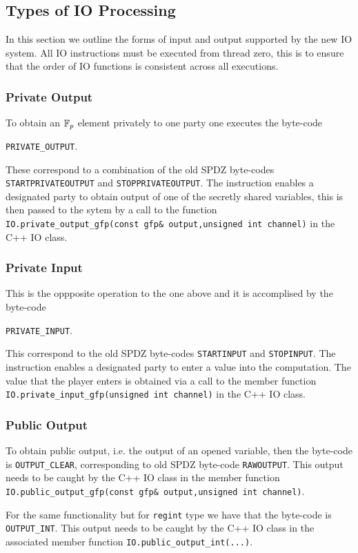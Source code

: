 \subsection{Types of IO Processing}
In this section we outline the forms of input and
output supported by the new IO system.
All IO instructions must be executed from thread zero, this is
to ensure that the order of IO functions is consistent across
all executions.

\subsubsection{Private Output}
To obtain an ${\mathbb{F}}_p$ element privately to one party one
executes the byte-code
\begin{center}
\verb+PRIVATE_OUTPUT+.
\end{center}
These correspond to a combination of the old SPDZ byte-codes
\verb+STARTPRIVATEOUTPUT+ and \verb+STOPPRIVATEOUTPUT+.
The instruction enables a designated party to obtain output of
one of the secretly shared variables, this is then passed
to the sytem by a call to the function
\verb+IO.private_output_gfp(const gfp& output,unsigned int channel)+ in the C++ IO class.

\subsubsection{Private Input}
This is the oppposite operation to the one above and it 
is accomplised by the byte-code
\begin{center}
\verb+PRIVATE_INPUT+.
\end{center}
This correspond to the old SPDZ byte-codes
\verb+STARTINPUT+ and \verb+STOPINPUT+.
The instruction enables a designated party to enter a value into
the computation.
The value that the player enters is obtained via a call to the 
member function
\verb+IO.private_input_gfp(unsigned int channel)+ in the C++ IO class.

\subsubsection{Public Output}
To obtain public output, i.e. the output of an opened variable,
then the byte-code is \verb+OUTPUT_CLEAR+, corresponding to
old SPDZ byte-code \verb+RAWOUTPUT+.
This output needs to be caught by the C++ IO class in
the member function \verb+IO.public_output_gfp(const gfp& output,unsigned int channel)+.

For the same functionality but for \verb|regint| type we have
that the byte-code is \verb+OUTPUT_INT+.
This output needs to be caught by the C++ IO class in
the associated member function 
\verb+IO.public_output_int(...)+.

